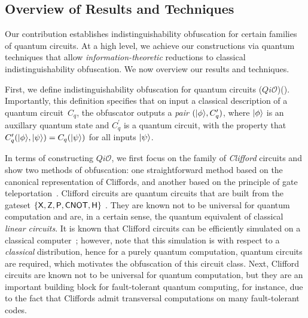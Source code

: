 



\subsection{Overview of Results and Techniques}
\label{sec:techniques}

Our contribution establishes indistinguishability obfuscation for certain families of quantum circuits.  At a high level, we achieve our constructions via quantum techniques that allow \emph{information-theoretic} reductions to classical indistinguishability obfuscation. We now overview our results and techniques.

First, we define indistinguishability obfuscation for quantum circuits ($Qi\mathcal{O}$)(). Importantly, this definition specifies that on input a classical description of a quantum circuit~$C_q$, the obfuscator outputs a \emph{pair} $({\lvert}\phi\rangle, C_q^\prime)$, where ${\lvert}\phi\rangle$ is an auxillary quantum state and $C_q^\prime$ is a quantum circuit, with the property that
$C_q^\prime({\lvert}\phi\rangle,{\lvert}\psi\rangle)=C_{q}({\lvert}\psi\rangle)$ for all inputs ${\lvert}\psi\rangle$.
 
In terms of constructing $Qi\mathcal{O}$, we first focus on the family of \emph{Clifford} circuits and show two methods of obfuscation: one straightforward method based on the canonical representation of Cliffords, and another based on the
principle of gate teleportation~\cite{GC99}.
Clifford circuits are quantum circuits that are built from the gateset $\{{\sf X}, {\sf Z}, {\sf P}, {\sf CNOT}, {\sf H}\}$ . They are known not to be universal for quantum computation and  are, in a certain sense, the quantum equivalent of classical \emph{linear circuits}. It is known that Clifford circuits can be efficiently simulated on a classical computer~\cite{Got98}; however, note that  this simulation is with respect to a \emph{classical} distribution, hence for a purely quantum computation, quantum circuits are required, which motivates the obfuscation of this circuit class. Next,  Clifford circuits are known not to be universal for quantum computation, but they are an important building block for fault-tolerant quantum computing, for instance, due to the fact that Cliffords admit transversal computations on many fault-tolerant codes.

